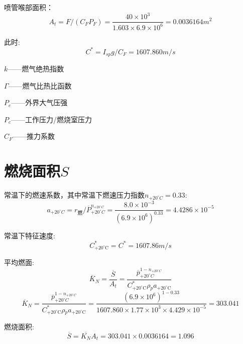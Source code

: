 喷管喉部面积：
\[
  A_t=F/\left( C_FP_F \right) =\frac{40\times 10^3}{1.603\times 6.9\times 10^6}=0.0036164m^2
\]

此时:
\[
  C^*=I_{sp}g/C_F=1607.860m/s
\]

$k$——燃气绝热指数

$\Gamma$——燃气比热比函数

$P_{e}$——外界大气压强

$P_{c}$——工作压力/燃烧室压力

$C_{F}$——推力系数

\section{燃烧面积$S$}

常温下的燃速系数，其中常温下燃速压力指数$n_{+20^\circ C}=0.33$:
\[
a_{+20^{\circ}C}=r_{\text{燃}}/\overline{P}_{+20^\circ C}^{n_{+20^\circ C}}=\frac{8.0\times 10^{-3}}{\left( 6.9\times 10^{6} \right) ^{0.33}}=4.4286\times 10^{-5}
\]

常温下特征速度:
\[
  C_{+20^{\circ}\mathrm{C}}^{*}=C^*=1607.86m/s
\]

平均燃面:
\[
\overline{K}_N=\frac{\overline{S}}{A_t}=\frac{\overline{p}_{+20^\circ C}^{1-n_{+20^\circ C}}}{C_{{+20^{\circ}\mathrm{C}}}^{*}\rho {_p}a_{+20^{\circ}\mathrm{C}}}
\]
\[
  \overline{K}_N=\frac{\overline{p}_{+20^\circ C}^{1-n_{+20^\circ C}}}{C_{{+20^{\circ}\mathrm{C}}}^{*}\rho {_p}a_{+20^{\circ}\mathrm{C}}}=\frac{(6.9\times 10^6)^{1-0.33}}{1607.860\times 1.77\times 10^3\times 4.429\times 10^{-5}}=303.041
\]

燃烧面积:
\[
  \overline{S}=\overline{K_N}A_t=303.041\times 0.0036164=1.096
\]

